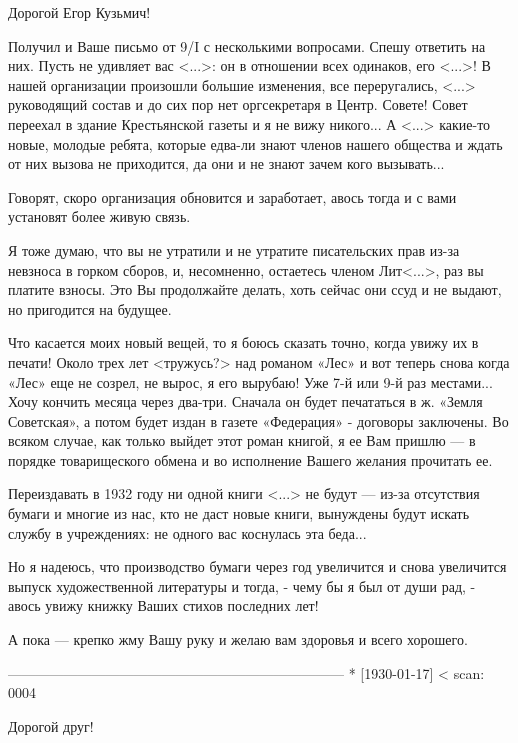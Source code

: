 Дорогой Егор Кузьмич!

 

Получил и Ваше письмо от 9/I с несколькими вопросами. Спешу ответить на них. Пусть не удивляет вас <...>: он в отношении всех одинаков, его <...>! В нашей организации произошли большие изменения, все переругались, <...> руководящий состав и до сих пор нет оргсекретаря в Центр. Совете! Совет переехал в здание Крестьянской газеты и я не вижу никого... А <...> какие-то новые, молодые ребята, которые едва-ли знают членов нашего общества и ждать от них вызова не приходится, да они и не знают зачем кого вызывать...

Говорят, скоро организация обновится и заработает, авось тогда и с вами установят более живую связь.

Я тоже думаю, что вы не утратили и не утратите писательских прав из-за невзноса в горком сборов, и, несомненно, остаетесь членом Лит<...>, раз вы платите взносы. Это Вы продолжайте делать, хоть сейчас они ссуд и не выдают, но пригодится на будущее.

Что касается моих новый вещей, то я боюсь сказать точно, когда увижу их в печати! Около трех лет <тружусь?> над романом «Лес» и вот теперь снова когда «Лес» еще не созрел, не вырос, я его вырубаю! Уже 7-й или 9-й раз местами... Хочу кончить месяца через два-три. Сначала он будет печататься в ж. «Земля Советская», а потом будет издан в газете «Федерация» - договоры заключены. Во всяком случае, как только выйдет этот роман книгой, я ее Вам пришлю — в порядке товарищеского обмена и во исполнение Вашего желания прочитать ее.

Переиздавать в 1932 году ни одной книги <...> не будут — из-за отсутствия бумаги и многие из нас, кто не даст новые книги, вынуждены будут искать службу в учреждениях: не одного вас коснулась эта беда...

Но я надеюсь, что производство бумаги через год увеличится и снова увеличится выпуск художественной литературы и тогда, - чему бы я был от души рад, - авось увижу книжку Ваших стихов последних лет!

 

А пока — крепко жму Вашу руку и желаю вам здоровья и всего хорошего.

------------------------------------------------------------------------
* [1930-01-17] <
scan: 0004


Дорогой друг!


